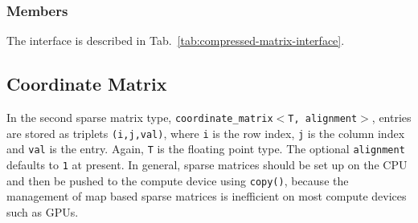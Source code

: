 \subsubsection{Members}
The interface is described in Tab.~\ref{tab:compressed-matrix-interface}. 

\subsection{Coordinate Matrix}
In the second sparse matrix type, \texttt{coordinate\_matrix$<$T, alignment$>$}, 
entries are stored as triplets \texttt{(i,j,val)}, where \texttt{i} is the row index, \texttt{j} is the column index and \texttt{val} is the entry. 
Again, \texttt{T} is the floating point type. The optional \texttt{alignment} defaults to \texttt{1} at present.
In general, sparse matrices should be set up on the
CPU and then be pushed to the compute device using \texttt{copy()}, because the management of map
based sparse matrices is inefficient on most compute devices such as GPUs.


